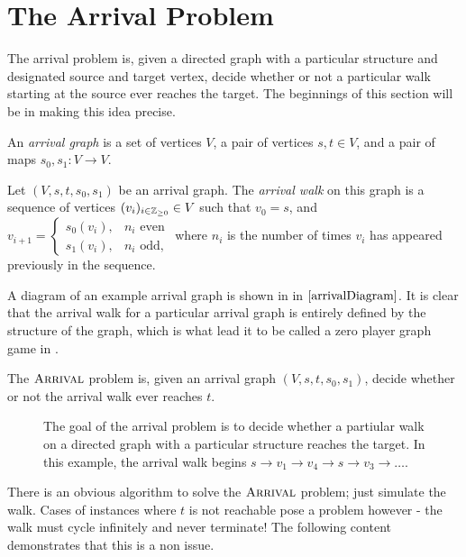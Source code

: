 \section{The Arrival Problem}
The arrival problem is, given a directed graph with
a particular structure and designated source and target vertex,
decide whether or not a particular walk starting at the source
ever reaches the target. The beginnings of this section will be
in making this idea precise.
\begin{definition}
  An \emph{arrival graph} is a set of vertices $V$, a pair of
  vertices $s, t \in V$, and a pair of maps 
  $s_0, s_1 : V \to V$. 
\end{definition}
\begin{definition}
  Let $(V, s, t, s_0, s_1)$ be an arrival graph. The \emph{arrival walk}
  on this graph is a sequence of vertices $(v_i)_{i \in \mathbb{Z}_{\geq 0}} \in V$
  such that $v_0 = s$, and $v_{i+1} = 
  \begin{cases} 
    s_0(v_i), & \text{$n_i$ even}\\  
    s_1(v_i), & \text{$n_i$ odd},
  \end{cases}$
  where $n_i$ is the number of times $v_i$ has appeared previously in
  the sequence.
\end{definition}
 A diagram of an example arrival graph is shown in 
in $\cref{arrivalDiagram}$.
It is clear that the arrival walk for a particular arrival graph
is entirely defined by the structure of the graph, which is what
lead it to be called a zero player graph game in \citep{arrivalBasic}.
\begin{definition}
  The $\textsc{Arrival}$ problem is, given an arrival graph $(V, s, t, s_0, s_1)$,
  decide whether or not the arrival walk ever reaches $t$.
\end{definition}
\begin{figure}[h]
  \centering
  
  \caption{The goal of the arrival problem is to decide whether a partiular walk on a directed graph with a particular
  structure reaches the target. In this example,
  the arrival walk begins $s \to v_1 \to v_4 \to s \to v_3 \to \ldots$.} \label{arrivalDiagram}
\end{figure}
There is an obvious algorithm to solve the $\textsc{Arrival}$ problem;
just simulate the walk. Cases of instances where $t$ is not reachable pose a problem however -
the walk must cycle infinitely and never terminate!
The following content demonstrates that this is a non issue.
